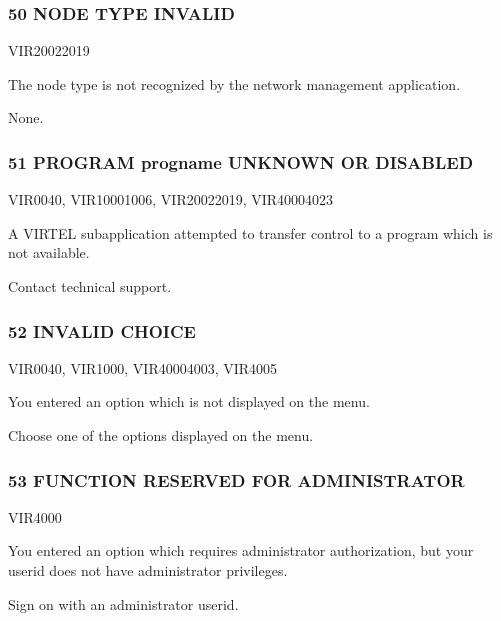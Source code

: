 \documentclass[letterpaper,10pt,english]{sphinxmanual}
\begin{document}
\subsubsection{50 NODE TYPE INVALID}
\label{\detokenize{messages:node-type-invalid}}\begin{description}
\sphinxAtStartPar
VIR2002\sphinxhyphen{}2019

\sphinxAtStartPar
The node type is not recognized by the network management application.

\sphinxAtStartPar
None.

\end{description}


\subsubsection{51 PROGRAM progname UNKNOWN OR DISABLED}
\label{\detokenize{messages:program-progname-unknown-or-disabled}}\begin{description}
\sphinxAtStartPar
VIR0040, VIR1000\sphinxhyphen{}1006, VIR2002\sphinxhyphen{}2019, VIR4000\sphinxhyphen{}4023

\sphinxAtStartPar
A VIRTEL subapplication attempted to transfer control to a program which is not available.

\sphinxAtStartPar
Contact technical support.

\end{description}


\subsubsection{52 INVALID CHOICE}
\label{\detokenize{messages:invalid-choice}}\begin{description}
\sphinxAtStartPar
VIR0040, VIR1000, VIR4000\sphinxhyphen{}4003, VIR4005

\sphinxAtStartPar
You entered an option which is not displayed on the menu.

\sphinxAtStartPar
Choose one of the options displayed on the menu.

\end{description}


\subsubsection{53 FUNCTION RESERVED FOR ADMINISTRATOR}
\label{\detokenize{messages:function-reserved-for-administrator}}\begin{description}
\sphinxAtStartPar
VIR4000

\sphinxAtStartPar
You entered an option which requires administrator authorization, but your userid does not have administrator privileges.

\sphinxAtStartPar
Sign on with an administrator userid.

\end{description}
\end{document}
